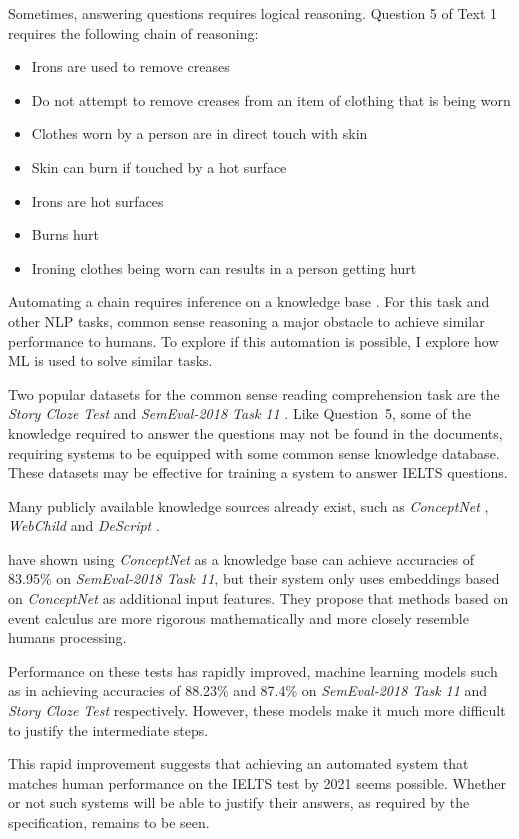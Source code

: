 \documentclass[12pt]{article}
\begin{document}
Sometimes, answering questions requires logical reasoning. Question 5 of Text 1 requires the following chain of reasoning:

\begin{itemize}
\item Irons are used to remove creases
\item Do not attempt to remove creases from an item of clothing that is being worn
\item Clothes worn by a person are in direct touch with skin
\item Skin can burn if touched by a hot surface
\item Irons are hot surfaces
\item Burns hurt
\item Ironing clothes being worn can results in a person getting hurt
\end{itemize}

Automating a chain requires inference on a knowledge base \citep{lecture6}. For this task and  other NLP tasks, common sense reasoning a  major obstacle to achieve similar performance to humans. To explore if this automation is possible, I explore how ML is used to solve similar  tasks.

Two popular datasets for the common sense reading comprehension task are the \emph{Story Cloze Test} \citep{mostafazadeh2017lsdsem} and \emph{SemEval-2018 Task 11} \citep{ostermann2018semeval}. Like Question~5, some of the knowledge required to answer the questions may not be found in the documents, requiring systems  to be equipped with some common sense knowledge database. These datasets may be effective for training a system to answer IELTS questions.

Many publicly available knowledge sources already exist, such as \emph{ConceptNet} \citep{speer2016conceptnet}, \emph{WebChild} \citep{tandon2014webchild} and \emph{DeScript} \citep{wanzare2016descript}. 

\citet{wang2018yuanfudao} have shown using \emph{ConceptNet} as a knowledge base can achieve accuracies of 83.95\% on \emph{SemEval-2018 Task 11}, but their system only uses embeddings based on \emph{ConceptNet} as additional input features. They propose that methods based on event calculus \citep{mueller2014commonsense} are more rigorous mathematically and more closely resemble  humans processing.

Performance on these tests has rapidly improved, machine learning models such as in \citep{xia2019incorporating} achieving accuracies of 88.23\% and 87.4\% on \emph{SemEval-2018 Task 11} and \emph{Story Cloze Test} respectively. However, these models make it much more difficult to justify the intermediate steps.

This rapid improvement suggests that achieving an automated system that matches human performance on the IELTS test by 2021 seems possible. Whether or not such systems will be able to justify their answers, as required by the specification, remains to be seen.



\end{document}
